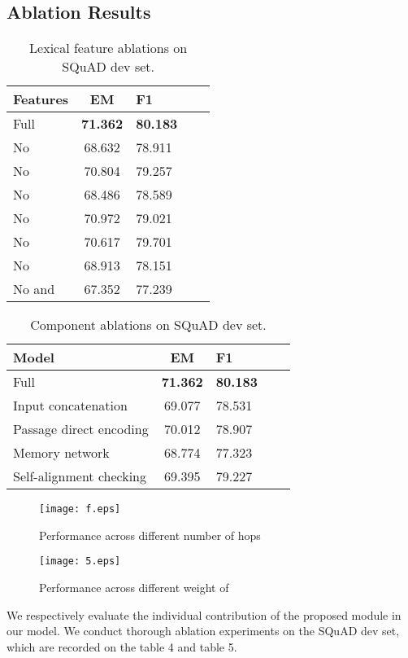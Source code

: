 \documentclass[letterpaper]{article} \usepackage{aaai18}  \usepackage{times}  \usepackage{helvet}  \usepackage{courier}  \usepackage{url}  \usepackage{graphicx}  \usepackage{booktabs}
\begin{document}
\subsection{Ablation Results}
\begin{table}[!t]
	\centering
	\begin{tabular}{lclcl}
		\toprule
		Features & EM &F1 \\
		\midrule
		Full & \textbf{71.362}        &\textbf{80.183}  \\
		\midrule
		No  &68.632      &78.911  \\
		No  &70.804        &79.257\\
		No  &68.486       &78.589\\
		No  &70.972&79.021\\
		No  &70.617           &79.701\\
		No  &68.913&78.151\\
		No  and  &67.352&77.239\\
		\bottomrule	
	\end{tabular}
	\caption{Lexical feature ablations on SQuAD dev set.}
\end{table}
\begin{table}[!t]
	\centering
	\begin{tabular}{lclcl}
		\toprule
		Model & EM &F1 \\
		\midrule
		Full & \textbf{71.362}        &\textbf{80.183}  \\
		\midrule
		Input concatenation &69.077  &78.531  \\
		Passage direct encoding &70.012&78.907 \\
		Memory network &68.774&77.323\\
		Self-alignment checking&69.395& 79.227 \\
		\bottomrule	
	\end{tabular}
	\caption{Component ablations on SQuAD dev set.}
\end{table}
\begin{figure}[t]
	\centering
	\texttt{[image: f.eps]}
	\caption{Performance across different number of hops}
\end{figure}
\begin{figure}[t]
	\centering
	\texttt{[image: 5.eps]}
	\caption{Performance across different weight of }
\end{figure}
We respectively evaluate the individual contribution of the proposed module in our model. We conduct thorough ablation experiments on the SQuAD dev set, which are recorded on the table 4 and table 5. 
\end{document}
